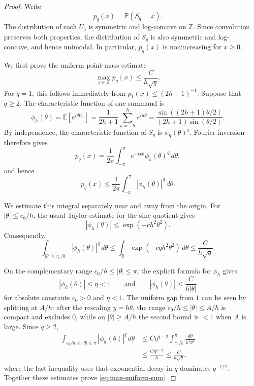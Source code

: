 \documentclass[11pt]{article}
\theoremstyle{plain}
\theoremstyle{definition}
\theoremstyle{remark}
\newcommand{\Z}{\mathbb Z}
\newcommand{\E}{\mathbb E}
\newcommand{\Prob}{\mathbb P}
\begin{document}
\begin{proof}
Write
\[
        p_q(x)=\Prob(S_q=x).
\]
The distribution of each $U_j$ is symmetric and log-concave on $\Z$. Since
convolution preserves both properties, the distribution of $S_q$ is also
symmetric and log-concave, and hence unimodal. In particular,
$p_q(x)$ is nonincreasing for $x\ge0$.

We first prove the uniform point-mass estimate
\begin{equation}\label{eq:max-uniform-sum}
        \max_{x\in\Z}p_q(x)\le \frac{C}{h\sqrt q}.
\end{equation}
For $q=1$, this follows immediately from
$p_1(x)\le(2h+1)^{-1}$. Suppose that $q\ge2$. The characteristic function
of one summand is
\[
        \phi_h(\theta)
        =\E \left[e^{i\theta U_1}\right]
        =\frac{1}{2h+1}\sum_{u=-h}^h e^{iu\theta}
        =\frac{\sin((2h+1)\theta/2)}
               {(2h+1)\sin(\theta/2)}.
\]
By independence, the characteristic function of $S_q$ is
$\phi_h(\theta)^q$. Fourier inversion therefore gives
\[
        p_q(x)
        =\frac{1}{2\pi}
          \int_{-\pi}^{\pi}
          e^{-ix\theta}\phi_h(\theta)^q\,d\theta,
\]
and hence
\[
        p_q(x)
        \le \frac{1}{2\pi}
          \int_{-\pi}^{\pi}|\phi_h(\theta)|^q\,d\theta.
\]

We estimate this integral separately near and away from the origin. For
$|\theta|\le c_0/h$, the usual Taylor estimate for the sine quotient gives
\[
        |\phi_h(\theta)|
        \le \exp(-c h^2\theta^2).
\]
Consequently,
\[
        \int_{|\theta|\le c_0/h}
        |\phi_h(\theta)|^q\,d\theta
        \le
        \int_{\mathbb R}
        \exp(-cqh^2\theta^2)\,d\theta
        \le \frac{C}{h\sqrt q}.
\]

On the complementary range \(c_0/h\le|\theta|\le\pi\), the explicit formula
for \(\phi_h\) gives
\[
        |\phi_h(\theta)|\le \eta<1
        \qquad\text{and}\qquad
        |\phi_h(\theta)|\le \frac{C}{h|\theta|}
\]
for absolute constants \(c_0>0\) and \(\eta<1\). The uniform gap from \(1\) can be seen by splitting at \(A/h\): after the rescaling \(y=h\theta\), the range \(c_0/h\le|\theta|\le A/h\) is compact and excludes \(0\), while on \(|\theta|\ge A/h\) the second bound is \(<1\) when \(A\) is large. Since \(q\ge2\),
\[
\begin{aligned}
        \int_{c_0/h\le|\theta|\le\pi}
        |\phi_h(\theta)|^q\,d\theta
        &\le
        C\eta^{q-2}
        \int_{c_0/h}^{\pi}
        \frac{d\theta}{h^2\theta^2}  \\
        &\le \frac{C\eta^{q-2}}{h}
        \le \frac{C}{h\sqrt q}.
\end{aligned}
\]
where the last inequality uses that exponential decay in \(q\) dominates \(q^{-1/2}\). Together these estimates prove \eqref{eq:max-uniform-sum}.


\end{proof}
\end{document}
